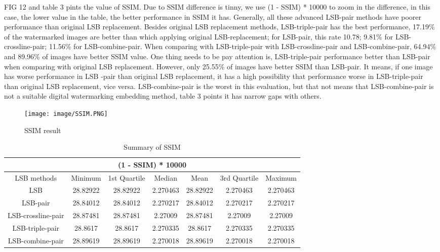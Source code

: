 \documentclass[%
    reprint,
    amsmath,amssymb,
    aps,
   ]{revtex4-1}
\begin{document}
   
   FIG 12 and table 3 pints the value of SSIM. Due to SSIM difference is tinny, we use (1 - SSIM) * 10000 to zoom in the difference, in this case, the lower value in the table, the better performance in SSIM it has. Generally, all these advanced LSB-pair methods have poorer performance than original LSB replacement. Besides original LSB replacement methods, LSB-triple-pair has the best performance, 17.19\% of the watermarked images are better than which applying original LSB-replacement; for LSB-pair, this rate 10.78; 9.81\% for LSB-crossline-pair; 11.56\% for LSB-combine-pair. When comparing with LSB-triple-pair with LSB-crossline-pair and LSB-combine-pair, 64.94\% and 89.96\% of images have better SSIM value. One thing needs to be pay attention is, LSB-triple-pair performance better than LSB-pair when comparing with original LSB replacement. However, only 25.55\% of images have better SSIM than LSB-pair. It means, if one image has worse performance in LSB -pair than original LSB replacement, it has a high possibility that performance worse in LSB-triple-pair than original LSB replacement, vice versa. LSB-combine-pair is the worst in this evaluation, but that not means that LSB-combine-pair is not a suitable digital watermarking embedding method, table 3 points it has narrow gaps with others. 
   
   \begin{figure}[h]
   \texttt{[image: image/SSIM.PNG]}
   \caption{SSIM result}
   \label{fig:figure}
   \end{figure} 
   
   
   \begin{table*}
   \begin{tabular}{ |c|c|c|c|c|c|c|  }
    \hline
    \multicolumn{7}{|c|}{(1 - SSIM) * 10000} \\
    \hline
    LSB methods    &Minimum&1st Quartile	&Median	&Mean	&3rd Quartile	&Maximum\\
    \hline
    LSB	            &28.82922	&28.82922	&2.270463	&28.82922	&2.270463	&2.270463\\
    \hline
    LSB-pair	        &28.84012	&28.84012	&2.270217	&28.84012	&2.270217	&2.270217\\
    \hline
    LSB-crossline-pair	&28.87481	&28.87481	&2.27009	&28.87481	&2.27009	&2.27009\\
    \hline
    LSB-triple-pair	&28.8617	&28.8617	&2.270335	&28.8617	&2.270335	&2.270335\\
    \hline
    LSB-combine-pair	&28.89619	&28.89619	&2.270018	&28.89619	&2.270018	&2.270018\\
    \hline
   \end{tabular}
    \caption{Summary of SSIM}
   \end{table*}
   
\end{document}
